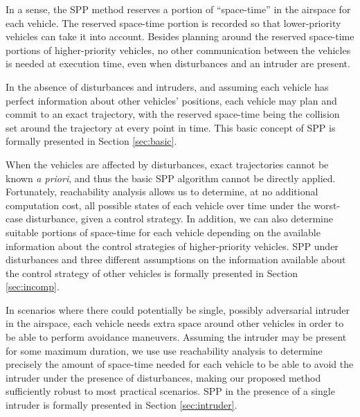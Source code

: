 In a sense, the SPP method reserves a portion of ``space-time'' in the airspace for each vehicle. The reserved space-time portion is recorded so that lower-priority vehicles can take it into account. Besides planning around the reserved space-time portions of higher-priority vehicles, no other communication between the vehicles is needed at execution time, even when disturbances and an intruder are present.

In the absence of disturbances and intruders, and assuming each vehicle has perfect information about other vehicles' positions, each vehicle may plan and commit to an exact trajectory, with the reserved space-time being the collision set around the trajectory at every point in time. This basic concept of SPP is formally presented in Section \ref{sec:basic}.

When the vehicles are affected by disturbances, exact trajectories cannot be known \textit{a priori}, and thus the basic SPP algorithm cannot be directly applied. Fortunately, reachability analysis allows us to determine, at no additional computation cost, all possible states of each vehicle over time under the worst-case disturbance, given a control strategy. In addition, we can also determine suitable portions of space-time for each vehicle depending on the available information about the control strategies of higher-priority vehicles. SPP under disturbances and three different assumptions on the information available about the control strategy of other vehicles is formally presented in Section \ref{sec:incomp}.

In scenarios where there could potentially be single, possibly adversarial intruder in the airspace, each vehicle needs extra space around other vehicles in order to be able to perform avoidance maneuvers. Assuming the intruder may be present for some maximum duration, we use use reachability analysis to determine precisely the amount of space-time needed for each vehicle to be able to avoid the intruder under the presence of disturbances, making our proposed method sufficiently robust to most practical scenarios. SPP in the presence of a single intruder is formally presented in Section \ref{sec:intruder}.

